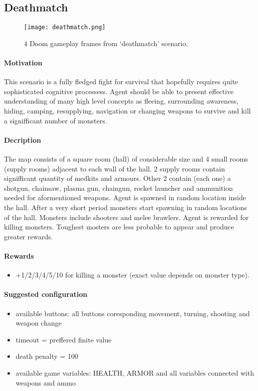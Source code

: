 	\subsection{Deathmatch}
		\begin{figure}
			\centering
			\texttt{[image: deathmatch.png]}
			\caption{4 Doom gameplay frames from `deathmatch' scenario.}\label{fig:deatchmatch}
		\end{figure}
		\paragraph{Motivation} 
	 		This scenario is a fully fledged fight for survival that hopefully requires quite sophisticated cognitive processess. Agent should be able to present effective understanding of many high level concepts as fleeing, surrounding awareness, hiding, camping, resupplying, navigation or changing weapons to survive and kill a signifficant number of monsters.

		\paragraph{Decription}
			The map consists of a square room (hall) of considerable size and 4 small rooms (supply rooms) adjacent to each wall of the hall. 2 supply rooms contain signifficant quantity of medkits and armours. Other 2 contain (each one) a shotgun, chainsaw, plasma gun, chaingun, rocket launcher and ammunition needed for aformentioned weapons. Agent is spawned in random location inside the hall. After a very short period monsters start spawning in random locations of the hall. Monsters include shooters and melee brawlers. Agent is rewarded for killing monsters. Toughest mosters are less probable to appear and produce greater rewards.
		\paragraph{Rewards}
			\begin{itemize}
				\item +1/2/3/4/5/10 for killing a monster (exact value depends on monster type).
			\end{itemize}
		
		\paragraph{Suggested configuration}
			\begin{itemize}
				\item available buttons: all buttons coresponding movement, turning, shooting and weapon change 
				\item timeout = preffered finite value
				\item death penalty = 100
				\item available game variables: HEALTH, ARMOR and all variables connected with weapons and ammo
			\end{itemize}		
	\newpage

